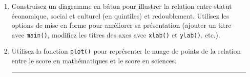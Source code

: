 \documentclass[12pt,twosided, notitlepage]{book}
\newenvironment{Shaded}{}{}
\newcommand{\KeywordTok}[1]{\textcolor[rgb]{0.00,0.00,1.00}{#1}}
\newcommand{\DataTypeTok}[1]{#1}
\newcommand{\CharTok}[1]{\textcolor[rgb]{0.00,0.50,0.50}{#1}}
\newcommand{\StringTok}[1]{\textcolor[rgb]{0.00,0.50,0.50}{#1}}
\newcommand{\OperatorTok}[1]{#1}
\newcommand{\NormalTok}[1]{#1}
\newif \ifsol
\renewenvironment{Shaded}{\begin{snugshade}}{\end{snugshade}}
\begin{document}
\begin{enumerate}
\def\labelenumi{\alph{enumi}.}
\item
  Construisez un diagramme en bâton pour illustrer la relation entre
  statut économique, social et culturel (en quintiles) et redoublement.
  Utilisez les options de mise en forme pour améliorer sa présentation
  (ajouter un titre avec \texttt{main()}, modifiez les titres des axes
  avec \texttt{xlab()} et \texttt{ylab()},
  etc.).

  \ifsol 

  \begin{center} \rule{0.5\linewidth}{\linethickness}\end{center}

\begin{Shaded}
\begin{Highlighting}[]
\KeywordTok{barplot}\NormalTok{(}
  \KeywordTok{table}\NormalTok{(stu2}\OperatorTok{$}\NormalTok{redoublant, stu2}\OperatorTok{$}\NormalTok{escsq)}
\NormalTok{  , }\DataTypeTok{main =} \StringTok{"Statut économique, social et culturel}\CharTok{\textbackslash{}n}\StringTok{et redoublement"}
\NormalTok{  , }\DataTypeTok{xlab =} \StringTok{"Statut économique, social et cuturel"}
\NormalTok{  , }\DataTypeTok{ylab =} \StringTok{"Répartition des redoublants"}
\NormalTok{  , }\DataTypeTok{legend.text =} \KeywordTok{c}\NormalTok{(}\StringTok{"Non-redoublant"}\NormalTok{, }\StringTok{"Redoublant"}\NormalTok{)}
\NormalTok{  , }\DataTypeTok{args.legend =} \KeywordTok{list}\NormalTok{(}\DataTypeTok{x =} \StringTok{"topleft"}\NormalTok{, }\DataTypeTok{bg =} \StringTok{"white"}\NormalTok{)}
\NormalTok{)}
\end{Highlighting}
\end{Shaded}

  \begin{center}\texttt{[image: livret\_files/figure-latex/unnamed-chunk-479-1]} \end{center}

  \begin{center} \rule{0.5\linewidth}{\linethickness}\end{center}

  \bigskip  \fi 
\item
  Utilisez la fonction \texttt{plot()} pour représenter le nuage de
  points de la relation entre le score en mathématiques et le score en
  sciences.

  \ifsol 

  \begin{center} \rule{0.5\linewidth}{\linethickness}\end{center}


\end{enumerate}
\end{document}
